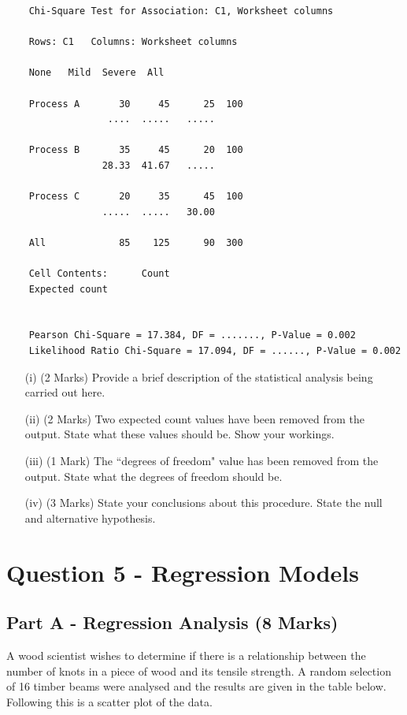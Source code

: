 \documentclass[a4paper,12pt]{article}
\begin{document}
\begin{framed}
	\begin{verbatim}
	Chi-Square Test for Association: C1, Worksheet columns 
	
	Rows: C1   Columns: Worksheet columns
	
	None   Mild  Severe  All
	
	Process A       30     45      25  100
	              ....  .....   .....
	
	Process B       35     45      20  100
	             28.33  41.67   .....
	
	Process C       20     35      45  100
	             .....  .....   30.00
	
	All             85    125      90  300
	
	Cell Contents:      Count
	Expected count
	
	
	Pearson Chi-Square = 17.384, DF = ......., P-Value = 0.002
	Likelihood Ratio Chi-Square = 17.094, DF = ......, P-Value = 0.002
	\end{verbatim}
\end{framed}

\newpage
\begin{itemize}
	\item[(i)] (2 Marks) Provide a brief description of the statistical analysis being carried out here.
	\item[(ii)] (2 Marks) Two expected count values have been removed from the output.
	State what these values should be. Show your workings.
	\item[(iii)] (1 Mark) The ``degrees of freedom" value has been removed from the output. State what the degrees of freedom should be.
	\item[(iv)] (3 Marks) State your conclusions about this procedure. State the null and alternative hypothesis.
	
\end{itemize}






\section*{Question 5 - Regression Models}
\subsection*{Part A - Regression Analysis (8 Marks)}
A wood scientist wishes to determine if there is a relationship between the number of knots in a piece of wood and its tensile strength. A random selection of 16 timber beams were analysed and the results are given in the table below. Following this is a scatter plot of the data.
\end{document}
